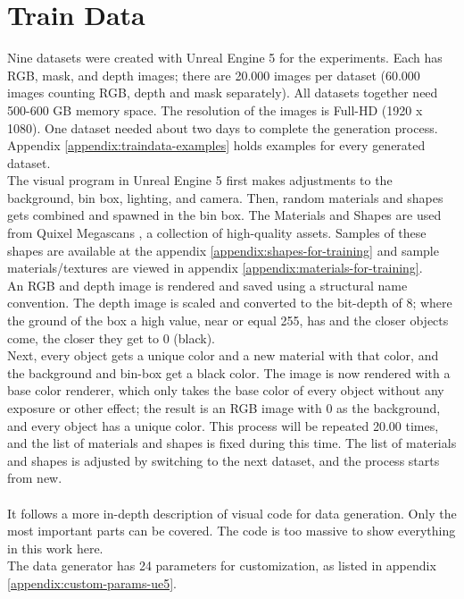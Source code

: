 	\section{Train Data}
	\label{sec:data}
		Nine datasets were created with Unreal Engine 5 \cite{ue5} for the experiments. Each has RGB, mask, and depth images; there are 20.000 images per dataset (60.000 images counting RGB, depth and mask separately). All datasets together need 500-600 GB memory space. The resolution of the images is Full-HD (1920 x 1080). One dataset needed about two days to complete the generation process. Appendix \ref{appendix:traindata-examples} holds examples for every generated dataset.\\
		The visual program in Unreal Engine 5 first makes adjustments to the background, bin box, lighting, and camera. Then, random materials and shapes gets combined and spawned in the bin box. The Materials and Shapes are used from Quixel Megascans \cite{Quixel}, a collection of high-quality assets. Samples of these shapes are available at the appendix \ref{appendix:shapes-for-training} and sample materials/textures are viewed in appendix \ref{appendix:materials-for-training}.\\
		An RGB and depth image is rendered and saved using a structural name convention. The depth image is scaled and converted to the bit-depth of 8; where the ground of the box a high value, near or equal 255, has and the closer objects come, the closer they get to 0 (black).\\
		Next, every object gets a unique color and a new material with that color, and the background and bin-box get a black color. The image is now rendered with a base color renderer, which only takes the base color of every object without any exposure or other effect; the result is an RGB image with 0 as the background, and every object has a unique color. This process will be repeated 20.00 times, and the list of materials and shapes is fixed during this time. The list of materials and shapes is adjusted by switching to the next dataset, and the process starts from new.\\
		\\
		It follows a more in-depth description of visual code for data generation. Only the most important parts can be covered. The code is too massive to show everything in this work here.\\
		The data generator has 24 parameters for customization, as listed in appendix \ref{appendix:custom-params-ue5}.\\
